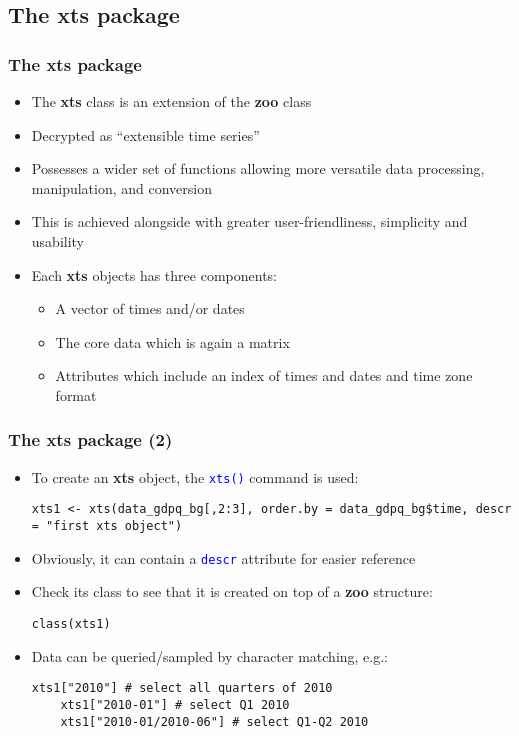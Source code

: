 \documentclass[10pt]{beamer}
\newcommand{\cc}[1]{\texttt{\textcolor{blue}{#1}}}
\theoremstyle{definition}
\begin{document}
\subsection{The xts package}
\begin{frame}[fragile]
\frametitle{The \textbf{xts} package}
\begin{itemize}
	\item The \textbf{xts} class is an extension of the \textbf{zoo} class
	\item Decrypted as ``extensible time series''
	\item Possesses a wider set of functions allowing more versatile data processing, manipulation, and conversion
	\item This is achieved alongside with greater user-friendliness, simplicity and usability
	\item Each \textbf{xts} objects has three components:
	\begin{itemize}
		\item A vector of times and/or dates
		\item The core data which is again a matrix 
		\item Attributes which include an index of times and dates and time zone format
	\end{itemize}
\end{itemize}
\end{frame}

\begin{frame}[fragile]
\frametitle{The \textbf{xts} package (2)}
\begin{itemize}
	\item To create an \textbf{xts} object, the \cc{xts()} command is used:
	\begin{lstlisting}[style = rstyle, breaklines]
	xts1 <- xts(data_gdpq_bg[,2:3], order.by = data_gdpq_bg$time, descr = "first xts object")
	\end{lstlisting}
	\item Obviously, it can contain a \cc{descr} attribute for easier reference
	\item Check its class to see that it is created on top of a \textbf{zoo} structure:
	\begin{lstlisting}[style = rstyle, breaklines]
	class(xts1)
	\end{lstlisting}
	\item Data can be queried/sampled by character matching, e.g.:
	\begin{lstlisting}[style = rstyle, breaklines]
	xts1["2010"] # select all quarters of 2010
	xts1["2010-01"] # select Q1 2010
	xts1["2010-01/2010-06"] # select Q1-Q2 2010
	\end{lstlisting}
\end{itemize}
\end{frame}
\end{document}

